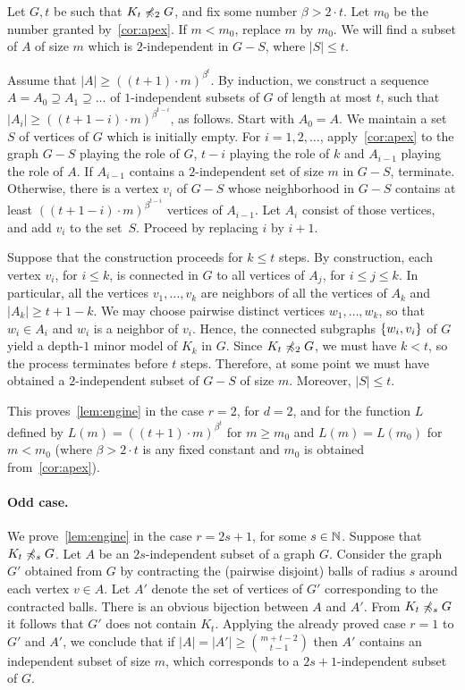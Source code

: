 Let $G,t$ be such that $K_t\not\preccurlyeq_2 G$, and fix some number $\beta>2\cdot t$. Let $m_0$ be the number granted by~\cref{cor:apex}. If $m<m_0$, replace $m$ by $m_0$. We will find 
a subset of $A$ of size $m$ which is $2$-independent in $G-S$, where $|S|\le t$.


Assume that $|A|\ge ((t+1)\cdot m)^{\beta^{t}}$. By induction, we
 construct a sequence  $A=A_0\supseteq A_1\supseteq\ldots$ 
of $1$-independent subsets of $G$
of length at most $t$,
such that $|A_i|\ge ((t+1-i)\cdot m)^{\beta^{t-i}}$,
 as follows. Start with $A_0=A$. We maintain a set $S$ of vertices of $G$ which is initially empty.
For $i=1,2,\ldots$,
 apply~\cref{cor:apex} to the graph $G-S$ playing the role of $G$, 
$t-i$ playing the role of $k$ and $A_{i-1}$
 playing the role of $A$.
If $A_{i-1}$ contains a $2$-independent set of size $m$ in $G-S$, terminate.
 Otherwise, there is a vertex $v_i$ of $G-S$
 whose neighborhood in $G-S$ contains at least
 $((t+1-i)\cdot m)^{\beta^{t-i}}$ vertices of $A_{i-1}$.
 Let $A_{i}$ consist of those vertices, and add $v_i$
 to the set~$S$.  
  Proceed by replacing $i$ by $i+1$.
 
Suppose that the construction proceeds for $k\le t$ steps.
By construction, each vertex $v_i$, for $i\le k$, is connected in $G$
 to all vertices of $A_{j}$, for $i\le j\le k$. In particular, all the vertices $v_1,\ldots,v_k$ are neighbors of all the vertices of $A_{k}$
 and $|A_k|\ge t+1-k$.
We may choose pairwise distinct vertices $w_1,\ldots,w_k$,
 so that $w_i\in A_i$ and $w_i$ is a neighbor of $v_i$.
 Hence, the connected subgraphs $\{w_i,v_i\}$ of $G$ yield a depth-$1$ minor model of $K_k$ in $G$.
 Since $K_t\not\preccurlyeq_2 G$, we must have $k<t$, so the process terminates before $t$ steps.
 Therefore, at some point we must have obtained a $2$-independent subset of $G-S$ of size $m$.
 Moreover, $|S|\le t$.
 
 This proves~\cref{lem:engine} in the case $r=2$, for $d=2$, and for the function $L$ defined by $L(m)=((t+1)\cdot m)^{\beta^t}$
 for $m\ge m_0$ and $L(m)=L(m_0)$ for $m<m_0$ (where $\beta>2\cdot t$ is any fixed constant and $m_0$ is obtained from~\cref{cor:apex}).


\paragraph{Odd case.}
We prove~\cref{lem:engine} in the case $r=2s+1$, for some $s\in \mathbb{N}$. Suppose that $K_t\not\preccurlyeq_s G$.
 Let $A$ be an $2s$-independent subset of a graph $G$. Consider the graph $G'$ obtained from $G$
by contracting the (pairwise disjoint) balls of radius $s$ around each vertex $v\in A$.
 Let $A'$ denote the set of vertices of $G'$ corresponding to the contracted balls. There is an obvious bijection between $A$ and $A'$.
From $K_t\not\preccurlyeq_s G$ it follows that $G'$ does not contain $K_t$. Applying the already proved case $r=1$ to $G'$ and $A'$, we conclude that 
if $|A|=|A'|\ge {m+t-2\choose t-1}$ then
 $A'$ contains an independent subset of size $m$,
 which corresponds to a $2s+1$-independent subset of $G$.
 
